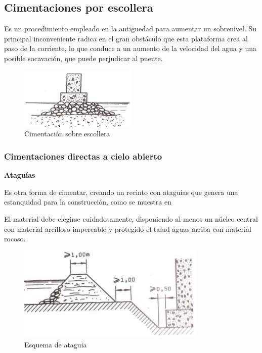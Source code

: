 \documentclass[../main.tex]{subfiles}
\begin{document}
\subsection{Cimentaciones por escollera}

Es un procedimiento empleado en la antiguedad para aumentar un sobrenivel. Su 
principal inconveniente radica en el gran obstáculo que esta plataforma crea al
paso de la corriente, lo que conduce a un aumento de la velocidad del agua y una
posible socavación, que puede perjudicar al puente.

\begin{figure}[ht]
  \centering
  \includegraphics[width=0.5\textwidth]{../images/20210419/escollera}
  \caption{Cimentación sobre escollera}
  \label{fig:escollera}
\end{figure}

\subsubsection{Cimentaciones directas a cielo abierto}

\textbf{Ataguías}

Es otra forma de cimentar, creando un recinto con ataguías que genera una
estanquidad para la construcción, como se muestra en 

El material debe elegirse cuidadosamente, disponiendo al menos un núcleo central
con material arcilloso impereable y protegido el talud aguas arriba con material
rocoso.

\begin{figure}[htpb]
  \centering
  \includegraphics[width=0.8\textwidth]{../images/20210419/ataguia}
  \caption{Esquema de ataguia}
  \label{fig:ataguia}
\end{figure}
\end{document}
